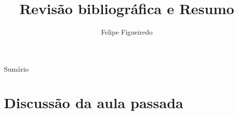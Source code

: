 \documentclass{beamer}
\title%
{Revisão bibliográfica e Resumo}
\subtitle
{} %
\author%
{Felipe Figueiredo}%
\institute[INTO] %
{Instituto Nacional de Traumatologia e Ortopedia
}
\date%
{}
\begin{document}
\begin{frame}
  \titlepage
\end{frame}

\begin{frame}{Sumário}
  \tableofcontents
\end{frame}








\section{Discussão da aula passada}
\end{document}
